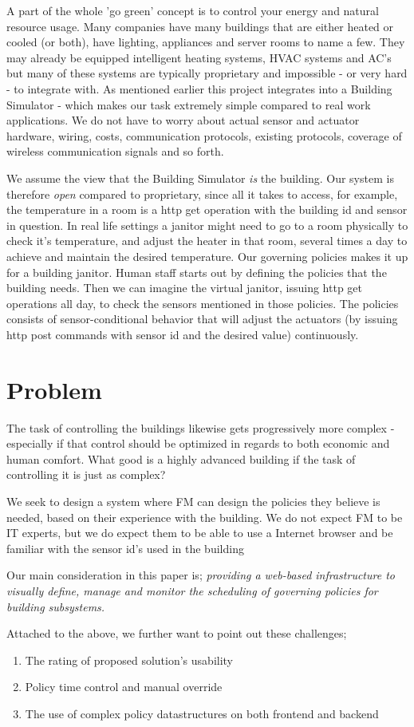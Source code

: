 A part of the whole 'go green' concept is to control your energy and natural resource usage. Many companies have many buildings that are either heated or cooled (or both), have lighting, appliances and server rooms to name a few. They may already be equipped intelligent heating systems, HVAC systems and AC's but many of these systems are typically proprietary and impossible - or very hard - to integrate with. As mentioned earlier this project integrates into a Building Simulator - which makes our task extremely simple compared to real work applications. We do not have to worry about actual sensor and actuator hardware, wiring, costs, communication protocols, existing protocols, coverage of wireless communication signals and so forth.

We assume the view that the Building Simulator \textit{is} the building. Our system is therefore \textit{open} compared to proprietary, since all it takes to access, for example, the temperature in a room is a http get operation with the building id and sensor in question. In real life settings a janitor might need to go to a room physically to check it's temperature, and adjust the heater in that room, several times a day to achieve and maintain the desired temperature. Our governing policies makes it up for a building janitor. Human staff starts out by defining the policies that the building needs. Then we can imagine the virtual janitor, issuing http get operations all day, to check the sensors mentioned in those policies. The policies consists of sensor-conditional behavior that will adjust the actuators (by issuing http post commands with sensor id and the desired value) continuously.

\section{Problem}
The task of controlling the buildings likewise gets progressively more complex - especially if that control should be optimized in regards to both economic and human comfort. What good is a highly advanced building if the task of controlling it is just as complex?

We seek to design a system where FM can design the policies they believe is needed, based on their experience with the building. We do not expect FM to be IT experts, but we do expect them to be able to use a Internet browser and be familiar with the sensor id's used in the building

Our main consideration in this paper is; \textit{providing a web-based infrastructure to visually define, manage and monitor the scheduling of governing policies for building subsystems.}

Attached to the above, we further want to point out these challenges;
\begin{enumerate}
	\item The rating of proposed solution's usability
	\item Policy time control and manual override
	\item The use of complex policy datastructures on both frontend and backend
\end{enumerate}